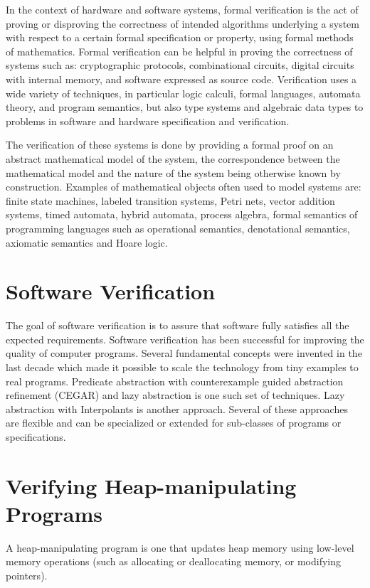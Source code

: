 \label{ch:intro}

In the context of hardware and software systems, formal verification is the act of proving or disproving the correctness of intended algorithms underlying a system with respect to a certain formal specification or property, using formal methods of mathematics. Formal verification can be helpful in proving the correctness of systems such as: cryptographic protocols, combinational circuits, digital circuits with internal memory, and software expressed as source code. Verification uses a wide variety of techniques, in particular logic calculi, formal languages, automata theory, and program semantics, but also type systems and algebraic data types to problems in software and hardware specification and verification.

The verification of these systems is done by providing a formal proof on an abstract mathematical model of the system, the correspondence between the mathematical model and the nature of the system being otherwise known by construction. Examples of mathematical objects often used to model systems are: finite state machines, labeled transition systems, Petri nets, vector addition systems, timed automata, hybrid automata, process algebra, formal semantics of programming languages such as operational semantics, denotational semantics, axiomatic semantics and Hoare logic.

\section{Software Verification}

The goal of software verification is to assure that software fully satisfies all the expected requirements. Software verification has been successful for improving the quality of computer programs. Several fundamental concepts were invented in the last decade which made it possible to scale the technology from tiny examples to real programs. Predicate abstraction \cite{ball01} with counterexample guided abstraction refinement (CEGAR) \cite{clarke03} and lazy abstraction \cite{henzinger02} is one such set of techniques. Lazy abstraction with Interpolants \cite{mcmillan06} is another approach. Several of these approaches are flexible and can be specialized or extended for sub-classes of programs or specifications.

\section{Verifying Heap-manipulating Programs}
A heap-manipulating program is one that updates heap memory using low-level memory operations (such as allocating or deallocating memory, or modifying pointers).

